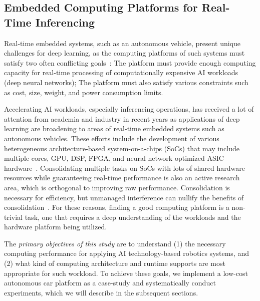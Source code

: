 \subsection{Embedded Computing Platforms for Real-Time Inferencing}
Real-time embedded systems, such as an autonomous vehicle, present
unique challenges for deep learning, as the computing platforms of such
systems must satisfy two often conflicting goals~\cite{Otterness2017}:
The platform must provide 
enough computing capacity for real-time processing of computationally
expensive AI workloads (deep neural networks);
The platform must also satisfy various
constraints such as cost, size, weight, and power consumption limits.

Accelerating AI workloads, especially inferencing
operations, has received a lot of attention from academia and industry
in recent years as applications of deep learning are broadening to
areas of real-time embedded systems such as autonomous vehicles. These
efforts include the development of various heterogeneous architecture-based 
system-on-a-chips (SoCs) that may include multiple cores, GPU,
DSP, FPGA, and neural network optimized ASIC hardware~\cite{Jouppi2017}.
Consolidating multiple tasks on SoCs with lots of shared hardware
resources while guaranteeing real-time performance is also an active
research area, which is orthogonal to improving raw
performance. Consolidation is necessary for efficiency, but unmanaged 
interference can nullify the benefits of consolidation~\cite{Kim2016}.
For these reasons, finding a good computing platform is a
non-trivial task, one that requires a deep understanding of the
workloads and the hardware platform being utilized.

The \emph{primary objectives of this study} are to understand (1) the
necessary computing performance for applying AI technology-based
robotics systems, and (2) what kind of computing architecture and
runtime supports are most appropriate for such workload. To
achieve these goals, we implement a low-cost autonomous car platform
as a case-study and systematically conduct experiments, which we will 
describe in the subsequent sections.
